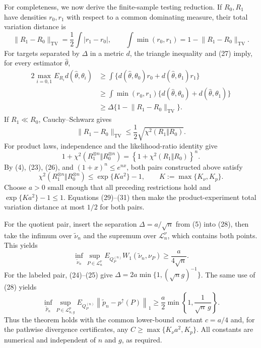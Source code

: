 For completeness, we now derive the finite-sample testing reduction.  If \(R_0,R_1\) have densities \(r_0,r_1\) with respect to a common dominating measure, their total variation distance is
\[
 \lVert R_1-R_0\rVert_{\mathrm{TV}}
 =\frac12\int|r_1-r_0|,
 \qquad
 \int\min(r_0,r_1)=1-\lVert R_1-R_0\rVert_{\mathrm{TV}}.                        \tag{27}
\]
For targets separated by \(\Delta\) in a metric \(d\), the triangle inequality and (27) imply, for every estimator \(\widehat\theta\),
\[
 \begin{split}
 2\max_{i=0,1}E_{R_i}d(\widehat\theta,\theta_i)
 &\ge \int\{d(\widehat\theta,\theta_0)r_0
             +d(\widehat\theta,\theta_1)r_1\}\\
 &\ge \int\min(r_0,r_1)
             \{d(\widehat\theta,\theta_0)+d(\widehat\theta,\theta_1)\}\\
 &\ge \Delta\{1-\lVert R_1-R_0\rVert_{\mathrm{TV}}\}.                         \tag{28}
 \end{split}
\]
If \(R_1\ll R_0\), Cauchy--Schwarz gives
\[
 \lVert R_1-R_0\rVert_{\mathrm{TV}}
 \le\frac12\sqrt{\chi^2(R_1\Vert R_0)}.                                       \tag{29}
\]
For product laws, independence and the likelihood-ratio identity give
\[
 1+\chi^2(R_1^{\otimes n}\Vert R_0^{\otimes n})
 =\left\{1+\chi^2(R_1\Vert R_0)\right\}^{n}.                                  \tag{30}
\]
By (4), (23), (26), and \((1+x)^n\le e^{nx}\), both pairs constructed above satisfy
\[
 \chi^2(R_1^{\otimes n}\Vert R_0^{\otimes n})
 \le \exp\{K a^2\}-1,
 \qquad K:=\max\{K_\nu,K_p\}.                                                  \tag{31}
\]
Choose \(a>0\) small enough that all preceding restrictions hold and \(\exp\{Ka^2\}-1\le1\).  Equations (29)--(31) then make the product-experiment total variation distance at most \(1/2\) for both pairs.

For the quotient pair, insert the separation \(\Delta=a/\sqrt n\) from (5) into (28), then take the infimum over \(\widetilde\nu_n\) and the supremum over \(\mathcal L_n^\nu\), which contains both points.  This yields
\[
 \inf_{\widetilde\nu_n}\sup_{P\in\mathcal L_n^\nu}
 E_{Q_P^{(n)}}W_1(\widetilde\nu_n,\nu_P)
 \ge\frac{a}{4\sqrt n}.                                                         \tag{32}
\]
For the labeled pair, (24)--(25) give \(\Delta=2a\min\{1,(\sqrt n g)^{-1}\}\).  The same use of (28) yields
\[
 \inf_{\widetilde p_n}\sup_{P\in\mathcal L_{n,g}^p}
 E_{Q_P^{(n)}}\left\lVert\widetilde p_n-p^\uparrow(P)\right\rVert_1
 \ge\frac a2\min\left\{1,\frac1{\sqrt n\,g}\right\}.                       \tag{33}
\]
Thus the theorem holds with the common lower-bound constant \(c=a/4\) and, for the pathwise divergence certificates, any \(C\ge\max\{K_\nu a^2,K_p\}\).  All constants are numerical and independent of \(n\) and \(g\), as required.
